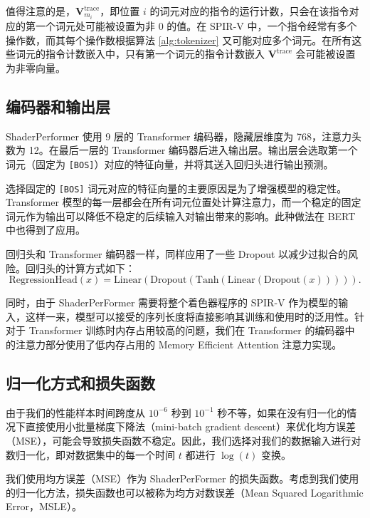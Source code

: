 值得注意的是，$ \mathbf{V}^\text{trace}_{m_i} $，即位置 $i$ 的词元对应的指令的运行计数，只会在该指令对应的第一个词元处可能被设置为非 0 的值。在 SPIR-V 中，一个指令经常有多个操作数，而其每个操作数根据算法 \ref{alg:tokenizer} 又可能对应多个词元。在所有这些词元的指令计数嵌入中，只有第一个词元的指令计数嵌入 $ \mathbf{V}^{\text{trace}} $ 会可能被设置为非零向量。

\subsection{编码器和输出层}

\label{sec:encoder_and_output_layer}

ShaderPerformer 使用 9 层的 Transformer 编码器，隐藏层维度为 768，注意力头数为 12。在最后一层的 Transformer 编码器后进入输出层。输出层会选取第一个词元（固定为 \verb|[BOS]|）对应的特征向量，并将其送入回归头进行输出预测。

选择固定的 \verb|[BOS]| 词元对应的特征向量的主要原因是为了增强模型的稳定性。Transformer 模型的每一层都会在所有词元位置处计算注意力，而一个稳定的固定词元作为输出可以降低不稳定的后续输入对输出带来的影响。此种做法在 BERT \cite{devlin-etal-2019-bert}中也得到了应用。

回归头和 Transformer 编码器一样，同样应用了一些 Dropout 以减少过拟合的风险。回归头的计算方式如下：
\begin{equation}
    \label{eq:reg_head}
    \text{RegressionHead}(x) = \text{Linear}(\text{Dropout}(\text{Tanh}(\text{Linear}(\text{Dropout}(x))))).
\end{equation}

同时，由于 ShaderPerFormer 需要将整个着色器程序的 SPIR-V 作为模型的输入，这样一来，模型可以接受的序列长度将直接影响其训练和使用时的泛用性。针对于 Transformer 训练时内存占用较高的问题，我们在 Transformer 的编码器中的注意力部分使用了低内存占用的 Memory Efficient Attention \cite{rabe2022selfattention} 注意力实现。

\subsection{归一化方式和损失函数}

由于我们的性能样本时间跨度从 $10^{-6}$ 秒到 $10^{-1}$ 秒不等，如果在没有归一化的情况下直接使用小批量梯度下降法（mini-batch gradient descent）来优化均方误差（MSE），可能会导致损失函数不稳定。因此，我们选择对我们的数据输入进行对数归一化，即对数据集中的每一个时间 $t$ 都进行 $\log(t)$ 变换。

我们使用均方误差（MSE）作为 ShaderPerFormer 的损失函数。考虑到我们使用的归一化方法，损失函数也可以被称为均方对数误差（Mean Squared Logarithmic Error，MSLE）。

